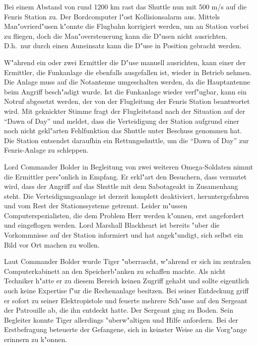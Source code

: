 Bei einem Abstand von rund 1200 km rast das Shuttle nun mit 500 m/s auf die Fenris Station zu. Der Bordcomputer l"ost Kollisionsalarm aus. Mittels Man"ovrierd"usen k"onnte die Flugbahn korrigiert werden, um an Station vorbei zu fliegen, doch die Man"oversteuerung kann die D"usen nicht ausrichten. D.h.~nur durch einen Au\3neinsatz kann die D"use in Position gebracht werden.

W"ahrend ein oder zwei Ermittler die D"use manuell ausrichten, kann einer der Ermittler, die Funkanlage die ebenfalls ausgefallen ist, wieder in Betrieb nehmen. Die Anlage muss auf die Notantenne umgeschalten werden, da die Hauptantenne beim Angriff besch"adigt wurde. Ist die Funkanlage wieder verf"ugbar, kann ein Notruf abgesetzt werden, der von der Flugleitung der Fenris Station beantwortet wird. Mit geknickter Stimme fragt der Flugleitstand nach der Situation auf der "`Dawn of Day"' und meldet, dass die Verteidigung der Station aufgrund einer noch nicht gekl"arten Fehlfunktion das Shuttle unter Beschuss genommen hat. Die Station entsendet daraufhin ein Rettungsshuttle, um die "`Dawn of Day"' zur Fenris-Anlage zu schleppen.

Lord Commander Bolder in Begleitung von zwei weiteren Omega-Soldaten nimmt die Ermittler pers"onlich in Empfang. Er erkl"art den Besuchern, dass vermutet wird, dass der Angriff auf das Shuttle mit dem Sabotageakt in Zusamenhang steht. Die Verteidigungsanlage ist derzeit komplett deaktiviert, heruntergefahren und vom Rest der Stationssysteme getrennt. Leider m"ussen Computerspezialisten, die dem Problem Herr werden k"onnen, erst angefordert und eingeflogen werden. Lord Marshall Blackheart ist bereits "uber die Vorkommnisse auf der Station informiert und hat angek"undigt, sich selbst ein Bild vor Ort machen zu wollen.

Laut Commander Bolder wurde Tiger "uberrascht, w"ahrend er sich im zentralen Computerkabinett an den Speicherb"anken zu schaffen machte. Als nicht Techniker h"atte er zu diesem Bereich keinen Zugriff gehabt und sollte eigentlich auch  keine Expertise f"ur die Rechenanlage besitzen. Bei seiner Entdeckung griff er sofort zu seiner Elektropistole und feuerte mehrere Sch"usse auf den Sergeant der Patrouille ab, die ihn entdeckt hatte. Der Sergeant ging zu Boden. Sein Begleiter konnte Tiger allerdings "uberw"altigen und Hilfe anfordern. Bei der Erstbefragung beteuerte der Gefangene, sich in keinster Weise an die Vorg"ange erinnern zu k"onnen.

